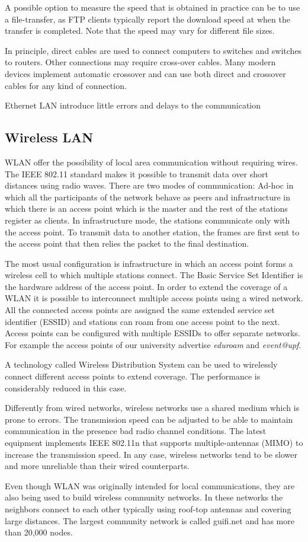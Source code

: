 A possible option to measure the speed that is obtained in practice can be to use a file-transfer, as FTP clients typically report the download speed at when the transfer is completed.
Note that the speed may vary for different file sizes.

In principle, direct cables are used to connect computers to switches and switches to routers.
Other connections may require cross-over cables.
Many modern devices implement automatic crossover and can use both direct and crossover cables for any kind of connection.

Ethernet LAN introduce little errors and delays to the communication

\subsection{Wireless LAN}

WLAN offer the possibility of local area communication without requiring wires.
The IEEE 802.11 standard makes it possible to transmit data over short distances using radio waves.
There are two modes of communication: Ad-hoc in which all the participants of the network behave as peers and infrastructure in which there is an access point which is the master and the rest of the stations register as clients.
In infrastructure mode, the stations communicate only with the access point.
To transmit data to another station, the frames are first sent to the access point that then relies the packet to the final destination.

The most usual configuration is infrastructure in which an access point forms a wireless cell to which multiple stations connect.
The Basic Service Set Identifier is the hardware address of the access point.
In order to extend the coverage of a WLAN it is possible to interconnect multiple access points using a wired network.
All the connected access points are assigned the same extended service set identifier (ESSID) and stations can roam from one access point to the next.
Access points can be configured with multiple ESSIDs to offer separate networks.
For example the access points of our university advertise \emph{eduroam} and \emph{event@upf}.

A technology called Wireless Distribution System can be used to wirelessly connect different access points to extend coverage.
The performance is considerably reduced in this case.

Differently from wired networks, wireless networks use a shared medium which is prone to errors.
The transmission speed can be adjusted to be able to maintain communication in the presence bad radio channel conditions.
The latest equipment implements IEEE 802.11n that supports multiple-antennas (MIMO) to increase the transmission speed.
In any case, wireless networks tend to be slower and more unreliable than their wired counterparts.

Even though WLAN was originally intended for local communications, they are also being used to build wireless community networks.
In these networks the neighbors connect to each other typically using roof-top antennas and covering large distances.
The largest community network is called guifi.net and has more than 20,000 nodes.

